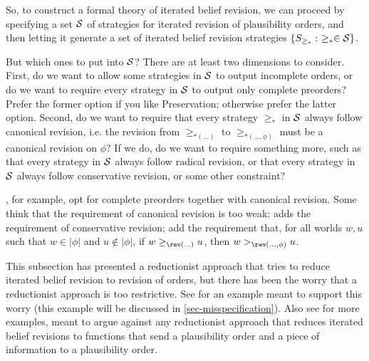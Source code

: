 So, to construct a formal theory of iterated belief revision, we can proceed by specifying a set ${\cal S}$ of strategies for iterated revision of plausibility orders, and then letting it generate a set of iterated belief revision strategies $\{S_{\ge_*} : \,\, \ge_* \in {\cal S} \}$.

But which ones to put into $\cal S$? There are at least two dimensions to consider. First, do we want to allow some strategies in $\cal S$ to output incomplete orders, or do we want to require every strategy in $\cal S$ to output only complete preorders? Prefer the former option if you like Preservation; otherwise prefer the latter option. Second, do we want to require that every strategy $\ge_{*}$ in $\cal S$ always follow canonical revision, i.e. the revision from $\ge_{*(\ldots)}$ to $\ge_{*(\ldots, \phi)}$ must be a canonical revision on $\phi$? If we do, do we want to require something more, such as that every strategy in $\cal S$ always follow radical revision, or that every strategy in $\cal S$ always follow conservative revision, or some other constraint? 


\citet{darwiche1997logic}, for example, opt for complete preorders together with canonical revision. Some think that the requirement of canonical revision is too weak: \citet{boutilier1996iterated} adds the requirement of conservative revision; \citet{jin2007iterated} add the requirement that, for all worlds $w, u$ such that $w \in |\phi|$ and $u \not\in |\phi|$, if $w \ge_{\rev(\ldots)} u$, then $w >_{\rev(\ldots, \phi)} u$. 

This subsection has presented a reductionist approach that tries to reduce iterated belief revision to revision of orders, but there has been the worry that a reductionist approach is too restrictive. See \citet{stalnaker2009iterated} for an example meant to support this worry (this example will be discussed in \autoref{sec-misspecification}). Also see \citet{booth2017irreducibility} for more examples, meant to argue against any reductionist approach that reduces iterated belief revisions to functions that send a plausibility order and a piece of information to a plausibility order.





